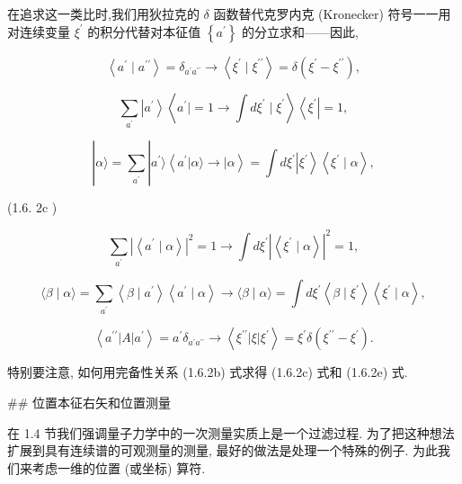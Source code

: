 \documentclass[lang=cn,newtx,10pt,scheme=chinese,thmcnt=section]{elegantbook}
\begin{document}
在追求这一类比时,我们用狄拉克的 $\delta$ 函数替代克罗内克 (Kronecker) 符号一一用对连续变量 ${\xi }^{\prime }$ 的积分代替对本征值 $\left\{ {a}^{\prime }\right\}$ 的分立求和——因此,

$$
\left\langle {{a}^{\prime } \mid {a}^{\prime \prime }}\right\rangle = {\delta }_{{a}^{\prime }{a}^{\prime \prime }} \rightarrow \left\langle {{\xi }^{\prime } \mid {\xi }^{\prime \prime }}\right\rangle = \delta \left( {{\xi }^{\prime } - {\xi }^{\prime \prime }}\right) , \tag{1.6.2a}
$$

$$
\mathop{\sum }\limits_{{a}^{\prime }}\left| {a}^{\prime }\right\rangle \left\langle {{a}^{\prime } \mid = 1 \rightarrow \int d{\xi }^{\prime } \mid {\xi }^{\prime }}\right\rangle \left\langle {\xi }^{\prime }\right| = 1, \tag{1.6.2b}
$$

$$
\left| {\alpha \rangle = \mathop{\sum }\limits_{{a}^{\prime }}}\right| {a}^{\prime }\rangle \left\langle {{a}^{\prime }\left| {\alpha \rangle \rightarrow }\right| \alpha }\right\rangle = \int d{\xi }^{\prime }\left| {\xi }^{\prime }\right\rangle \left\langle {{\xi }^{\prime } \mid \alpha }\right\rangle ,
$$

(1.6. $2\mathrm{c}$ )

$$
\mathop{\sum }\limits_{{a}^{\prime }}{\left| \left\langle {a}^{\prime } \mid \alpha \right\rangle \right| }^{2} = 1 \rightarrow \int d{\xi }^{\prime }{\left| \left\langle {\xi }^{\prime } \mid \alpha \right\rangle \right| }^{2} = 1, \tag{1.6.2d}
$$

$$
\langle \beta \mid \alpha \rangle = \mathop{\sum }\limits_{{a}^{\prime }}\left\langle {\beta \mid {a}^{\prime }}\right\rangle \left\langle {{a}^{\prime } \mid \alpha }\right\rangle \rightarrow \langle \beta \mid \alpha \rangle = \int d{\xi }^{\prime }\left\langle {\beta \mid {\xi }^{\prime }}\right\rangle \left\langle {{\xi }^{\prime } \mid \alpha }\right\rangle , \tag{1.6.2e}
$$

$$
\left\langle {{a}^{\prime \prime }\left| A\right| {a}^{\prime }}\right\rangle = {a}^{\prime }{\delta }_{{a}^{\prime }{a}^{\prime \prime }} \rightarrow \left\langle {{\xi }^{\prime \prime }\left| \xi \right| {\xi }^{\prime }}\right\rangle = {\xi }^{\prime }\delta \left( {{\xi }^{\prime \prime } - {\xi }^{\prime }}\right) . \tag{1.6.2f}
$$

特别要注意, 如何用完备性关系 (1.6.2b) 式求得 (1.6.2c) 式和 (1.6.2e) 式.

## 位置本征右矢和位置测量

在 1.4 节我们强调量子力学中的一次测量实质上是一个过滤过程. 为了把这种想法扩展到具有连续谱的可观测量的测量, 最好的做法是处理一个特殊的例子. 为此我们来考虑一维的位置 (或坐标) 算符.
\end{document}
